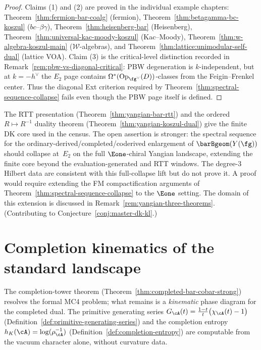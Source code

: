 \begin{proof}
Claims (1) and (2) are proved in the individual example chapters:
Theorem~\ref{thm:fermion-bar-coalg} (fermion),
Theorem~\ref{thm:betagamma-bc-koszul} ($bc$--$\beta\gamma$),
Theorem~\ref{thm:heisenberg-bar} (Heisenberg),
Theorem~\ref{thm:universal-kac-moody-koszul} (Kac--Moody),
Theorem~\ref{thm:w-algebra-koszul-main} ($\mathcal{W}$-algebras),
and Theorem~\ref{thm:lattice:unimodular-self-dual} (lattice VOA).
Claim (3) is the critical-level distinction recorded in
Remark~\ref{rem:pbw-vs-diagonal-critical}: PBW degeneration is
$k$-independent, but at $k=-h^\vee$ the $E_2$ page contains
$\Omega^*(\mathrm{Op}_{\fg^\vee}(D))$-classes from the
Feigin--Frenkel center. Thus the diagonal Ext criterion required by
Theorem~\ref{thm:spectral-sequence-collapse} fails even though the
PBW page itself is defined.
\end{proof}

\begin{remark}\label{rem:yangian-collapse-conj}
\ClaimStatusConjectured
{}
The RTT presentation (Theorem~\ref{thm:yangian-bar-rtt}) and the
ordered $R\mapsto R^{-1}$ duality theorem
(Theorem~\ref{thm:yangian-koszul-dual}) give the finite DK core used
in the census. The open assertion is stronger: the spectral sequence
for the ordinary-derived/completed/coderived enlargement of
$\barBgeom(Y(\fg))$ should collapse at~$E_2$ on the full
$\Eone$-chiral Yangian landscape, extending the finite core beyond
the evaluation-generated and RTT windows. The degree-$3$ Hilbert data
are consistent with this full-collapse lift but do not prove it.
A proof would require extending the FM compactification arguments of
Theorem~\ref{thm:spectral-sequence-collapse} to the $\Eone$ setting.
The domain of this extension is discussed in
Remark~\ref{rem:yangian-three-theorems}.
(Contributing to Conjecture~\ref{conj:master-dk-kl}.)
\end{remark}

\section*{Completion kinematics of the standard landscape}
\label{sec:completion-kinematics-census}

The completion-tower theorem
(Theorem~\ref{thm:completed-bar-cobar-strong}) resolves the formal
MC4 problem; what remains is a \emph{kinematic} phase diagram for the
completed dual. The primitive generating series
$G_\cA(t) = \tfrac{1-t}{t}\bigl(\chi_\cA(t)-1\bigr)$
(Definition~\ref{def:primitive-generating-series}) and the completion
entropy $h_K(\cA) = \log(\rho_\cA^{-1})$
(Definition~\ref{def:completion-entropy}) are computable from the
vacuum character alone, without curvature data.

